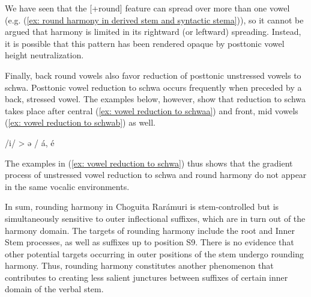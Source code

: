 We have seen that the [+round] feature can spread over more than one vowel (e.g. (\ref{ex: round harmony in derived stem and syntactic stema})), so it cannot be argued that harmony is limited in its rightward (or leftward) spreading. Instead, it is possible that this pattern has been rendered opaque by posttonic vowel height neutralization.

Finally, back round vowels also favor reduction of posttonic unstressed vowels to schwa. Posttonic vowel reduction to schwa occurs frequently when preceded by a back, stressed vowel. The examples below, however, show that reduction to schwa takes place after central (\ref{ex: vowel reduction to schwaa}) and front, mid vowels (\ref{ex: vowel reduction to schwab}) as well.

\ea\label{ex: vowel reduction to schwa}
{/i/ > ə / á, é \longrule}\\

    \label{ex: vowel reduction to schwaa}
        \label{ex: vowel reduction to schwab}
    \z
\z

The examples in (\ref{ex: vowel reduction to schwa}) thus shows that the gradient process of unstressed vowel reduction to schwa and round harmony do not appear in the same  vocalic environments.

In sum, rounding harmony in Choguita Rarámuri is stem-controlled but is simultaneously sensitive to outer inflectional suffixes, which are in turn out of the harmony domain. The targets of rounding harmony include the root and Inner Stem processes, as well as suffixes up to position S9. There is no evidence that other potential targets occurring in outer positions of the stem undergo rounding harmony. Thus, rounding harmony constitutes another phenomenon that contributes to creating less salient junctures between suffixes of certain inner domain of the verbal stem.


